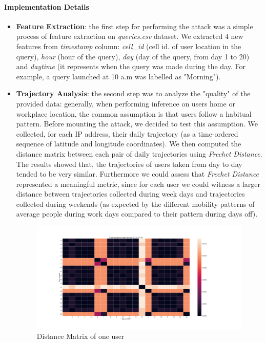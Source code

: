 \documentclass[10pt,conference,compsocconf]{IEEEtran}
\begin{document}
\paragraph{Implementation Details}
\begin{itemize}
    \item \textbf{Feature Extraction}: the first step for performing the attack
    was a simple process of feature extraction on     \textit{queries.csv} dataset. We extracted 4 new features from \textit{timestamp} column:
    \textit{cell\_id} (cell id. of user location in the query), \textit{hour} (hour of the query),
    \textit{day} (day of the query, from day 1 to 20) and \textit{daytime}
    (it represents when the query was made during the day. For example, a query launched
    at 10 a.m was labelled as "Morning").

    \item \textbf{Trajectory Analysis}: the second step was to
    analyze the "quality" of the provided data: generally, when performing
    inference on users home or workplace location, the common assumption is that
    users follow a habitual pattern. Before
    mounting the attack, we decided to test this assumption. We collected, for
    each IP address, their daily trajectory (as a time-ordered sequence of
    latitude and longitude coordinates). We then computed the distance matrix
    between each pair of daily trajectories using \textit{Frechet Distance}. The
    results showed that, the trajectories of users taken from day to day tended to be very similar.
    Furthermore we could assess that \textit{Frechet Distance} represented a
    meaningful metric, since for each user we could witness a larger distance
    between trajectories collected during week days and trajectories collected
    during weekends (as expected by the different mobility patterns of average people
    during work days compared to their pattern during days off).


    \begin{figure}[h!]
        \centering
        \includegraphics[width=0.9\linewidth]{../privacy_evaluation/daily_trajectories/7.210.121.52-matrix.png}
        \caption{Distance Matrix of one user}
        \label{fig:matrix}
    \end{figure}



\end{itemize}
\end{document}
